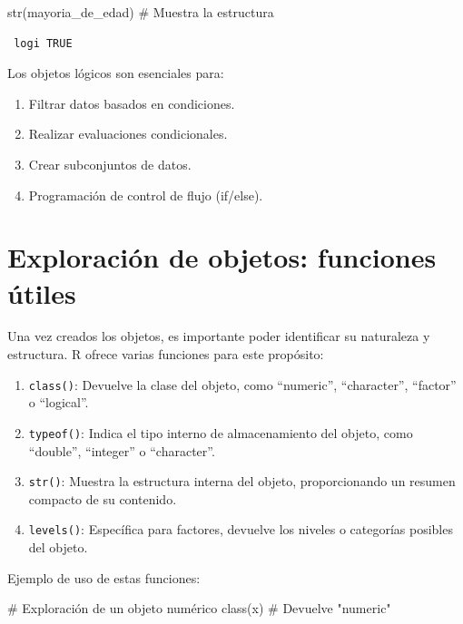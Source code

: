 \documentclass[
  spanish,
  a4paper,
  DIV=11,
  numbers=noendperiod,
  onepage,
  openany]{scrreprt}
\newenvironment{Shaded}{\begin{snugshade}}{\end{snugshade}}
\newcommand{\CommentTok}[1]{\textcolor[rgb]{0.37,0.37,0.37}{#1}}
\newcommand{\FunctionTok}[1]{\textcolor[rgb]{0.28,0.35,0.67}{#1}}
\newcommand{\NormalTok}[1]{\textcolor[rgb]{0.00,0.23,0.31}{#1}}
\begin{document}
\begin{Shaded}
\begin{Highlighting}[]
\FunctionTok{str}\NormalTok{(mayoria\_de\_edad)      }\CommentTok{\# Muestra la estructura}
\end{Highlighting}
\end{Shaded}

\begin{verbatim}
 logi TRUE
\end{verbatim}

Los objetos lógicos son esenciales para:

\begin{enumerate}
\def\labelenumi{\arabic{enumi}.}
\item
  Filtrar datos basados en condiciones.
\item
  Realizar evaluaciones condicionales.
\item
  Crear subconjuntos de datos.
\item
  Programación de control de flujo (if/else).
\end{enumerate}

\section{Exploración de objetos: funciones
útiles}\label{exploraciuxf3n-de-objetos-funciones-uxfatiles}

Una vez creados los objetos, es importante poder identificar su
naturaleza y estructura. R ofrece varias funciones para este propósito:

\begin{enumerate}
\def\labelenumi{\arabic{enumi}.}
\item
  \texttt{class()}: Devuelve la clase del objeto, como ``numeric'',
  ``character'', ``factor'' o ``logical''.
\item
  \texttt{typeof()}: Indica el tipo interno de almacenamiento del
  objeto, como ``double'', ``integer'' o ``character''.
\item
  \texttt{str()}: Muestra la estructura interna del objeto,
  proporcionando un resumen compacto de su contenido.
\item
  \texttt{levels()}: Específica para factores, devuelve los niveles o
  categorías posibles del objeto.
\end{enumerate}

Ejemplo de uso de estas funciones:

\begin{Shaded}
\begin{Highlighting}[]
\CommentTok{\# Exploración de un objeto numérico}
\FunctionTok{class}\NormalTok{(x)      }\CommentTok{\# Devuelve "numeric"}
\end{Highlighting}
\end{Shaded}
\end{document}
